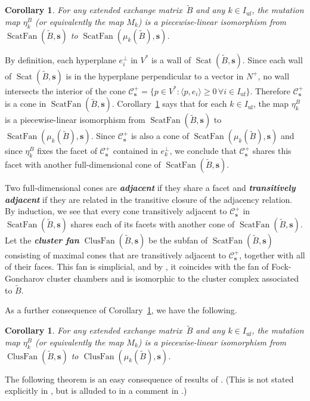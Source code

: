 \documentclass{amsart}
\newtheorem{cor}[proposition]{Corollary}
\theoremstyle{definition}
\theoremstyle{remark}
\numberwithin{equation}{section}
\newcommand{\newword}[1]{\textbf{\emph{#1}}}
\newcommand{\uf}{{\operatorname{uf}}}
\newcommand{\set}[1]{{\lbrace #1 \rbrace}}
\newcommand{\br}[1]{{\langle #1 \rangle}}
\newcommand{\0}{{\mathbf{0}}}
\newcommand{\s}{\mathbf{s}}
\newcommand{\tB}{\tilde{B}}
\newcommand{\C}{\mathcal{C}}
\newcommand{\Scat}{\operatorname{Scat}}
\newcommand{\ScatFan}{\operatorname{ScatFan}}
\newcommand{\ClusFan}{\operatorname{ClusFan}}
\begin{document}
\begin{cor}\label{mut scat fan}
For any extended exchange matrix~$\tB$ and any $k\in I_\uf$, the mutation map $\eta^B_k$ (or equivalently the map $M_k$) is a piecewise-linear isomorphism from $\ScatFan(\tB,\s)$ to $\ScatFan(\mu_k(\tB),\s)$.
\end{cor}

By definition, each hyperplane $e_i^\perp$ in $V^*$ is a wall of $\Scat(\tB,\s)$.
Since each wall of $\Scat(\tB,\s)$ is in the hyperplane perpendicular to a vector in $N^+$, no wall intersects the interior of the cone $\C_\s^+=\set{p\in V^*:\br{p,e_i}\ge0\,\forall i\in I_\uf}$.
Therefore $\C_\s^+$ is a cone in $\ScatFan(\tB,\s)$.
Corollary~\ref{mut scat fan} says that for each $k\in I_\uf$, the map $\eta_k^B$ is a piecewise-linear isomorphism from $\ScatFan(\tB,\s)$ to $\ScatFan(\mu_k(\tB),\s)$.
Since $\C_\s^+$ is also a cone of $\ScatFan(\mu_k(\tB),\s)$ and since $\eta_k^B$ fixes the facet of $\C_\s^+$ contained in $e_k^\perp$, we conclude that $\C_\s^+$ shares this facet with another full-dimensional cone of $\ScatFan(\tB,\s)$.

Two full-dimensional cones are \newword{adjacent} if they share a facet and \newword{transitively adjacent} if they are related in the transitive closure of the adjacency relation.
By induction, we see that every cone transitively adjacent to $\C_\s^+$ in $\ScatFan(\tB,\s)$ shares each of its facets with another cone of $\ScatFan(\tB,\s)$.
Let the \newword{cluster fan} $\ClusFan(\tB,\s)$ be the subfan of $\ScatFan(\tB,\s)$ consisting of maximal cones that are transitively adjacent to $\C_\s^+$, together with all of their faces.
This fan is simplicial, and by \cite[Theorem~0.8]{GHKK}, it coincides with the fan of Fock-Goncharov cluster chambers and is isomorphic to the cluster complex associated to $\tB$.

As a further consequence of Corollary~\ref{mut scat fan}, we have the following.

\begin{cor}\label{mut clus fan}
For any extended exchange matrix~$\tB$ and any $k\in I_\uf$, the mutation map $\eta^B_k$ (or equivalently the map $M_k$) is a piecewise-linear isomorphism from $\ClusFan(\tB,\s)$ to $\ClusFan(\mu_k(\tB),\s)$.
\end{cor}



The following theorem is an easy consequence of results of \cite{GHKK}.
(This is not stated explicitly in \cite{GHKK}, but is alluded to in a comment in \cite[Construction~4.1]{GHKK}.)
\end{document}
